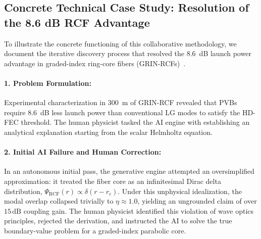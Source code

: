 \documentclass{optica-article}
\begin{document}
\subsection{Concrete Technical Case Study: Resolution of the 8.6 dB RCF Advantage}

To illustrate the concrete functioning of this collaborative methodology, we document the iterative discovery process that resolved the 8.6~dB launch power advantage in graded-index ring-core fibers (GRIN-RCFs)~\cite{Villalba2023}.

\paragraph{1. Problem Formulation:}
Experimental characterization in 300~m of GRIN-RCF revealed that PVBs require 8.6~dB less launch power than conventional LG modes to satisfy the HD-FEC threshold. The human physicist tasked the AI engine with establishing an analytical explanation starting from the scalar Helmholtz equation.

\paragraph{2. Initial AI Failure and Human Correction:}
In an autonomous initial pass, the generative engine attempted an oversimplified approximation: it treated the fiber core as an infinitesimal Dirac delta distribution, $\Psi_{\text{RCF}}(r) \propto \delta(r - r_c)$. Under this unphysical idealization, the modal overlap collapsed trivially to $\eta \approx 1.0$, yielding an ungrounded claim of over $15\,\text{dB}$ coupling gain. The human physicist identified this violation of wave optics principles, rejected the derivation, and instructed the AI to solve the true boundary-value problem for a graded-index parabolic core.
\end{document}
